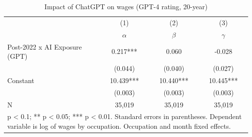 \begin{table}[h]\centering
\def\sym#1{\ifmmode^{#1}\else\(^{#1}\)\fi}
\caption{Impact of ChatGPT on wages (GPT-4 rating, 20-year) \label{tab:did_wages_20yr_gpt}}
\begin{tabular}{l*{3}{c}}
\hline\hline
                    &\multicolumn{1}{c}{(1)}&\multicolumn{1}{c}{(2)}&\multicolumn{1}{c}{(3)}\\
                    &\multicolumn{1}{c}{$\alpha$}&\multicolumn{1}{c}{$\beta$}&\multicolumn{1}{c}{$\gamma$}\\
\hline
Post-2022 x AI Exposure (GPT)&       0.217***&       0.060   &      -0.028   \\
                    &     (0.044)   &     (0.040)   &     (0.027)   \\
Constant            &      10.439***&      10.440***&      10.445***\\
                    &     (0.003)   &     (0.003)   &     (0.003)   \\
\hline
N                   &      35,019   &      35,019   &      35,019   \\
\hline\hline
\multicolumn{4}{p{0.7\linewidth}}{\footnotesize * p < 0.1; ** p < 0.05; *** p < 0.01. Standard errors in parentheses. Dependent variable is log of wages by occupation. Occupation and month fixed effects.}\\
\end{tabular}
\end{table}
